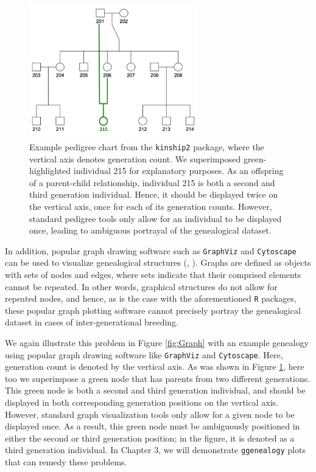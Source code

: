 \documentclass[11pt,a4paper,oldfontcommands,openany]{memoir}
\numberwithin{equation}{section} %
\newcommand{\pkg}[1]{{\texttt{#1}}}
\begin{document}
\begin{figure}[H]
    \begin{framed}
    \centering
    \includegraphics[width=0.65\textwidth]{kinshipFig}
    \end{framed}
    \caption{Example pedigree chart from the \pkg{kinship2} package, where the vertical axis denotes generation count. We superimposed green-highlighted individual 215 for explanatory purposes. As an offspring of a parent-child relationship, individual 215 is both a second and third generation individual. Hence, it should be displayed twice on the vertical axis, once for each of its generation counts. However, standard pedigree tools only allow for an individual to be displayed once, leading to ambiguous portrayal of the genealogical dataset.}
    \label{fig:kinshipFig}
\end{figure}

In addition, popular graph drawing software such as \pkg{GraphViz} and \pkg{Cytoscape} can be used to visualize genealogical structures (\citealt{graphvizCit}, \citealt{cytoscapeCit}). Graphs are defined as objects with sets of nodes and edges, where sets indicate that their comprised elements cannot be repeated. In other words, graphical structures do not allow for repeated nodes, and hence, as is the case with the aforementioned \pkg{R} packages, these popular graph plotting software cannot precisely portray the genealogical dataset in cases of inter-generational breeding.

We again illustrate this problem in Figure \ref{fig:Graph} with an example genealogy using popular graph drawing software like \pkg{GraphViz} and \pkg{Cytoscape}. Here, generation count is denoted by the vertical axis. As was shown in Figure \ref{fig:kinshipFig}, here too we superimpose a green node that has parents from two different generations. This green node is both a second and third generation individual, and should be displayed in both corresponding generation positions on the vertical axis. However, standard graph visualization tools only allow for a given node to be displayed once. As a result, this green node must be ambiguously positioned in either the second or third generation position; in the figure, it is denoted as a third generation individual. In Chapter 3, we will demonstrate \pkg{ggenealogy} plots that can remedy these problems.
\end{document}
